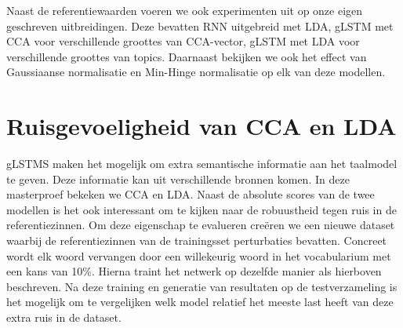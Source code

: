 Naast de referentiewaarden voeren we ook experimenten uit op onze eigen geschreven uitbreidingen.
Deze bevatten RNN uitgebreid met LDA, gLSTM met CCA voor verschillende groottes van CCA-vector, gLSTM met LDA voor verschillende groottes van topics. Daarnaast bekijken we ook het effect van Gaussiaanse normalisatie en Min-Hinge normalisatie op elk van deze modellen.

\section{Ruisgevoeligheid van CCA en LDA} %
\label{sec:ruisgevoeligheid_van_cca_en_lda_exp}
gLSTMS maken het mogelijk om extra semantische informatie aan het taalmodel te geven. Deze informatie kan uit verschillende bronnen komen. In deze masterproef bekeken we CCA en LDA. Naast de absolute scores van de twee modellen is het ook interessant om te kijken naar de robuustheid tegen ruis in de referentiezinnen.
Om deze eigenschap te evalueren cre\"eren we een nieuwe dataset waarbij de referentiezinnen van de trainingsset perturbaties bevatten.
Concreet wordt elk woord vervangen door een willekeurig woord in het vocabularium met een kans van 10\%. Hierna traint het netwerk op dezelfde manier als hierboven beschreven. Na deze training en generatie van resultaten op de testverzameling is het mogelijk om te vergelijken welk model relatief het meeste last heeft van deze extra ruis in de dataset.


